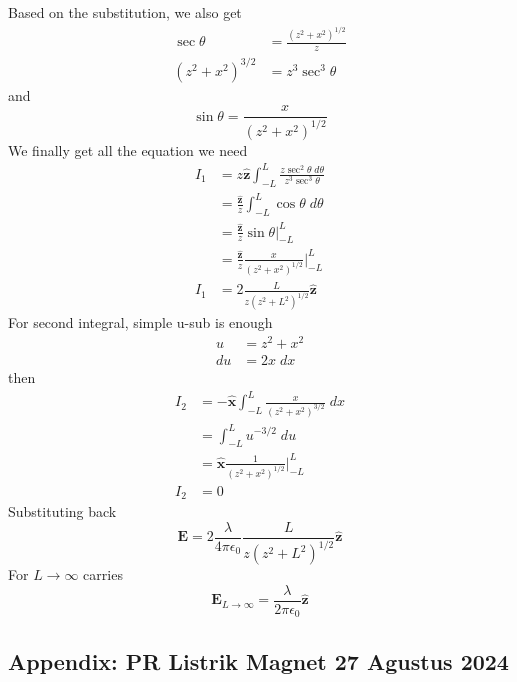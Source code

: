 \documentclass[../../../main.tex]{subfiles}
\begin{document}
Based on the substitution, we also get
\begin{align*}
    \sec\theta&=\frac{(z^2+x^2)^{1/2}}{z}\\
    (z^2+x^2)^{3/2}&=z^3\sec^3\theta
\end{align*}
and
\begin{equation*}
    \sin \theta=\frac{x}{(z^2+x^2)^{1/2}}
\end{equation*}
We finally get all the equation we need
\begin{align*}
    I_1&=z \mathbf{\hat{z}} \int_{-L}^{L} \frac{z\sec^2 \theta\;d\theta}{z^3\sec^3\theta} \\
    &=\frac{\mathbf{\hat{z}}}{z} \int_{-L}^{L}\cos \theta\;d\theta\\
    &=\frac{\mathbf{\hat{z}}}{z}\sin\theta\bigg|_{-L}^{L}\\
    &=\frac{\mathbf{\hat{z}}}{z} \frac{x}{(z^2+x^2)^{1/2}}\bigg|_{-L}^{L}\\
    I_1&=2 \frac{L}{z(z^2+L^2)^{1/2}}\mathbf{\hat{z}}
\end{align*}
For second integral, simple u-sub is enough
\begin{align*}
    u&=z^2+x^2\\
    du&= 2x\;dx
\end{align*}
then\begin{align*}
    I_2&=- \mathbf{\hat{x}} \int_{-L}^{L} \frac{x}{(z^2+x^2)^{3/2}}\;dx\\
    &=\int_{-L}^{L} u^{-3/2}\;du\\
    &=\mathbf{\hat{x}}\frac{1 }{(z^2+x^2)^{1/2}} \bigg|_{-L}^{L}\\
    I_2&=0
\end{align*}
Substituting back
\begin{equation*}
    \mathbf{E}=2 \frac{\lambda}{4\pi\epsilon_0}\frac{L}{z(z^2+L^2)^{1/2}}\mathbf{\hat{z}}
\end{equation*}
For $L\rightarrow\infty$ carries\begin{equation*}
    \mathbf{E}_{L\rightarrow\infty}=\frac{\lambda}{2\pi \epsilon_0}\mathbf{\hat{z}}
\end{equation*}

\subsection*{Appendix: PR Listrik Magnet 27 Agustus 2024}
\end{document}

